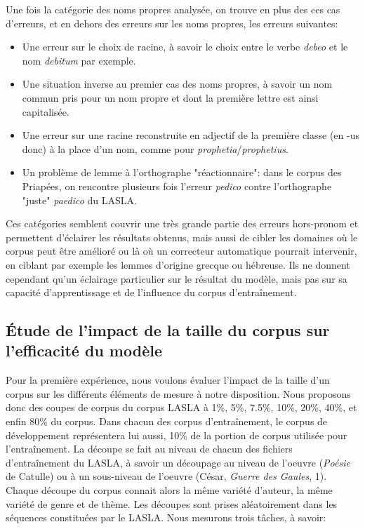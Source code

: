 Une fois la catégorie des noms propres analysée, on trouve en plus des ces cas d'erreurs, et en dehors des erreurs sur les noms propres, les erreurs suivantes:
\begin{itemize}
    \item Une erreur sur le choix de racine, à savoir le choix entre le verbe \textit{debeo} et le nom \textit{debitum} par exemple.
    \item Une situation inverse au premier cas des noms propres, à savoir un nom commun pris pour un nom propre et dont la première lettre est ainsi capitalisée.
    \item Une erreur sur une racine reconstruite en adjectif de la première classe (en -us donc) à la place d'un nom, comme pour \textit{prophetia}/\textit{prophetius}.
    \item Un problème de lemme à l'orthographe "réactionnaire": dans le corpus des Priapées, on rencontre plusieurs fois l'erreur \textit{pedico} contre l'orthographe "juste" \textit{paedico} du LASLA.
\end{itemize}

Ces catégories semblent couvrir une très grande partie des erreurs hors-pronom et permettent d'éclairer les résultats obtenus, mais aussi de cibler les domaines où le corpus peut être amélioré ou là où un correcteur automatique pourrait intervenir, en ciblant par exemple les lemmes d'origine grecque ou hébreuse. Ils ne donnent cependant qu'un éclairage particulier sur le résultat du modèle, mais pas sur sa capacité d'apprentissage et de l'influence du corpus d'entraînement.

\subsection{Étude de l'impact de la taille du corpus sur l'efficacité du modèle}
\label{lemmatisation:extensibilite:tailles}

Pour la première expérience, nous voulons évaluer l'impact de la taille d'un corpus sur les différents éléments de mesure à notre disposition. Nous proposons donc des coupes de corpus du corpus LASLA à 1\%, 5\%, 7.5\%, 10\%, 20\%, 40\%, et enfin 80\% du corpus. Dans chacun des corpus d'entraînement, le corpus de développement représentera lui aussi, 10\% de la portion de corpus utilisée pour l'entraînement. La découpe se fait au niveau de chacun des fichiers d'entraînement du LASLA, à savoir un découpage au niveau de l'oeuvre (\textit{Poésie} de Catulle) ou à un sous-niveau de l'oeuvre (César, \textit{Guerre des Gaules}, 1). Chaque découpe du corpus connait alors la même variété d'auteur, la même variété de genre et de thème. Les découpes sont prises aléatoirement dans les séquences constituées par le LASLA. Nous mesurons trois tâches, à savoir:

